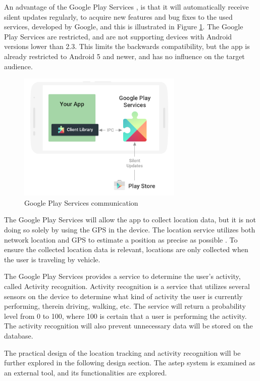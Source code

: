 An advantage of the Google Play Services \cite{GapiOverview}, is that it will automatically receive silent updates regularly, to acquire new features and bug fixes to the used services, developed by Google, and this is illustrated in Figure \ref{fig:gapifigure}.
The Google Play Services are restricted, and are not supporting devices with Android versions lower than 2.3. 
This limits the backwards compatibility, but the app is already restricted to Android 5 and newer, and has no influence on the target audience.

\begin{figure}[h]
	\centering
	\includegraphics[width=0.7\textwidth]{figures/play-services-diagram.png}
	\caption{Google Play Services communication\cite{GapiFigure}}
	\label{fig:gapifigure}
\end{figure}

The Google Play Services will allow the app to collect location data, but it is not doing so solely by using the GPS in the device. 
The location service utilizes both network location and GPS to estimate a position as precise as possible \cite{GapiLocation}. 
To ensure the collected location data is relevant, locations are only collected when the user is traveling by vehicle.

The Google Play Services provides a service to determine the user's activity, called Activity recognition. 
Activity recognition is a service that utilizes several sensors on the device to determine what kind of activity the user is currently performing, therein driving, walking, etc.
The service will return a probability level from 0 to 100, where 100 is certain that a user is performing the activity.
The activity recognition will also prevent unnecessary data will be stored on the database. 

The practical design of the location tracking and activity recognition will be further explored in the following design section.
The \gls{astep} system is examined as an external tool, and its functionalities are explored.